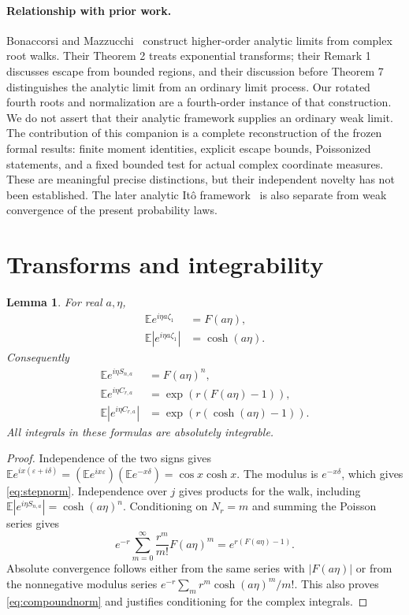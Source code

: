 \documentclass[11pt]{article}
\newtheorem{lemma}[theorem]{Lemma}
\newcommand{\E}{\mathbb E}\newcommand{\Pp}{\mathbb P}
\begin{document}
\paragraph{Relationship with prior work.}
Bonaccorsi and Mazzucchi~\cite{BM} construct higher-order analytic limits
from complex root walks. Their Theorem 2 treats exponential transforms;
their Remark 1 discusses escape from bounded regions, and their discussion
before Theorem 7 distinguishes the analytic limit from an ordinary limit
process. Our rotated fourth roots and normalization are a fourth-order
instance of that construction. We do not assert that their analytic
framework supplies an ordinary weak limit. The contribution of this
companion is a complete reconstruction of the frozen formal results:
finite moment identities, explicit escape bounds, Poissonized statements,
and a fixed bounded test for actual complex coordinate measures. These
are meaningful precise distinctions, but their independent novelty has
not been established. The later analytic It\^o framework~\cite{BCM} is
also separate from weak convergence of the present probability laws.

\section{Transforms and integrability}
\begin{lemma}\label{lem:step}
For real $a,\eta$,
\begin{align}
 \E e^{i\eta a\zeta_1}&=F(a\eta),\label{eq:step}\\
 \E\left|e^{i\eta a\zeta_1}\right|&=\cosh(a\eta).
 \label{eq:stepnorm}
\end{align}
Consequently
\begin{align}
 \E e^{i\eta S_{n,a}}&=F(a\eta)^n,\label{eq:walktransform}\\
 \E e^{i\eta C_{r,a}}&=\exp(r(F(a\eta)-1)),\label{eq:compound}\\
 \E\left|e^{i\eta C_{r,a}}\right|&=\exp(r(\cosh(a\eta)-1)).
 \label{eq:compoundnorm}
\end{align}
All integrals in these formulas are absolutely integrable.
\end{lemma}
\begin{proof}
Independence of the two signs gives
$\E e^{ix(\varepsilon+i\delta)}=(\E e^{ix\varepsilon})
(\E e^{-x\delta})=\cos x\cosh x$. The modulus is $e^{-x\delta}$,
which gives \eqref{eq:stepnorm}. Independence over $j$ gives products
for the walk, including $\E|e^{i\eta S_{n,a}}|=\cosh(a\eta)^n$.
Conditioning on $N_r=m$ and summing the Poisson series gives
\[
 e^{-r}\sum_{m=0}^\infty\frac{r^m}{m!}F(a\eta)^m
 =e^{r(F(a\eta)-1)}.
\]
Absolute convergence follows either from the same series with
$|F(a\eta)|$ or from the nonnegative modulus series
$e^{-r}\sum_m r^m\cosh(a\eta)^m/m!$.
This also proves \eqref{eq:compoundnorm} and justifies conditioning for
the complex integrals.
\end{proof}
\end{document}
